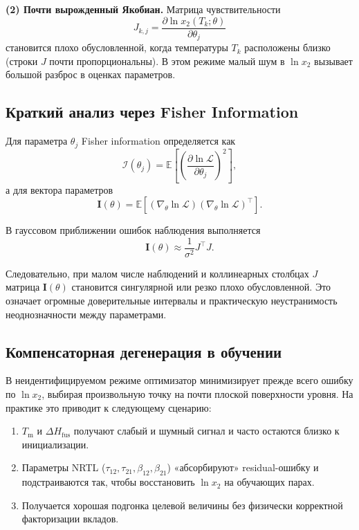 \documentclass[11pt]{article}
\begin{document}
\textbf{(2) Почти вырожденный Якобиан.}
Матрица чувствительности
\begin{equation*}
J_{k,j}=\frac{\partial \ln x_2(T_k;\theta)}{\partial \theta_j}
\end{equation*}
становится плохо обусловленной, когда температуры $T_k$ расположены близко (строки $J$ почти пропорциональны). В этом режиме малый шум в $\ln x_2$ вызывает большой разброс в оценках параметров.

\subsection{Краткий анализ через Fisher Information}

Для параметра $\theta_j$ Fisher information определяется как
\begin{equation*}
\mathcal{I}(\theta_j)=\mathbb{E}\!\left[\left(\frac{\partial \ln \mathcal{L}}{\partial \theta_j}\right)^2\right],
\end{equation*}
а для вектора параметров
\begin{equation*}
\mathbf{I}(\theta)=\mathbb{E}\!\left[(\nabla_\theta \ln \mathcal{L})(\nabla_\theta \ln \mathcal{L})^\top\right].
\end{equation*}

В гауссовом приближении ошибок наблюдения выполняется
\begin{equation*}
\mathbf{I}(\theta) \approx \frac{1}{\sigma^2}J^\top J.
\end{equation*}

Следовательно, при малом числе наблюдений и коллинеарных столбцах $J$ матрица $\mathbf{I}(\theta)$ становится сингулярной или резко плохо обусловленной. Это означает огромные доверительные интервалы и практическую неустранимость неоднозначности между параметрами.

\subsection{Компенсаторная дегенерация в обучении}

В неидентифицируемом режиме оптимизатор минимизирует прежде всего ошибку по $\ln x_2$, выбирая произвольную точку на почти плоской поверхности уровня. На практике это приводит к следующему сценарию:

\begin{enumerate}
  \item $T_{\mathrm{m}}$ и $\Delta H_{\mathrm{fus}}$ получают слабый и шумный сигнал и часто остаются близко к инициализации.
  \item Параметры NRTL ($\tau_{12},\tau_{21},\beta_{12},\beta_{21}$) «абсорбируют» residual-ошибку и подстраиваются так, чтобы восстановить $\ln x_2$ на обучающих парах.
  \item Получается хорошая подгонка целевой величины без физически корректной факторизации вкладов.
\end{enumerate}
\end{document}
